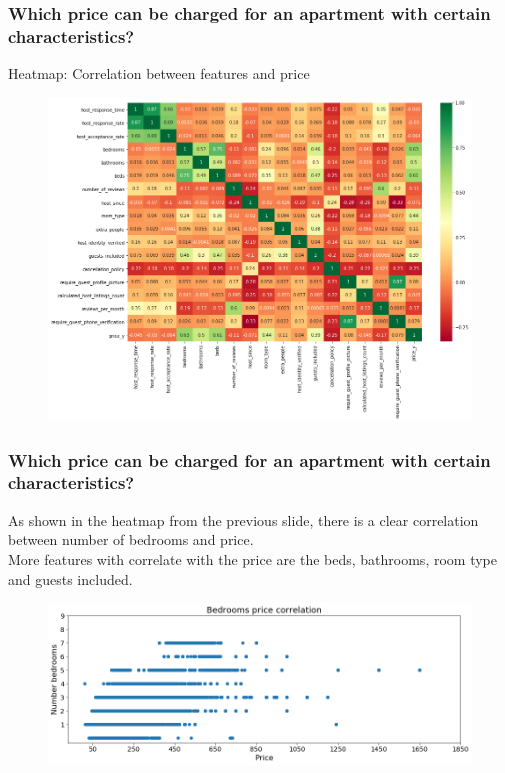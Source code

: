 \documentclass{beamer}
\begin{document}

\begin{frame}
\frametitle{Which price can be charged for an apartment with certain characteristics?}
Heatmap: Correlation between features and price
\begin{figure}
\includegraphics[width=0.8\linewidth]{photo/8_heatmap}
\end{figure}
\end{frame}
\begin{frame}
\frametitle{Which price can be charged for an apartment with certain characteristics?}
As shown in the heatmap from the previous slide, there is a clear correlation between number of bedrooms and price.\\More features with correlate with the price are the beds, bathrooms, room type and guests included.
\begin{figure}
\includegraphics[width=0.8\linewidth]{photo/10_bedrooms_price_correlation}
\end{figure}
\end{frame}
\end{document}
